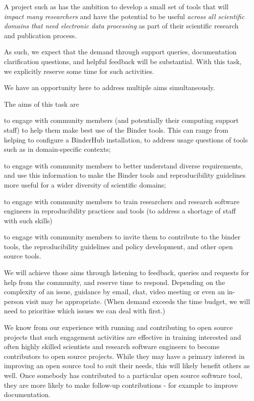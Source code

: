 \begin{task}[
  title=Community support and engagement,
  id=community-support,
  lead=SRL,
  PM=13,
  wphases={0-36!.36},
  partners={MP,QS,UIO,IFR}
]
A project such as \TheProject{} has the ambition to develop a small set of tools
that will \emph{impact many researchers} and have the potential to be useful
\emph{across all scientific domains that need electronic data processing} as part of their
scientific research and publication process.

As such, we expect that the demand through support queries, documentation
clarification questions, and helpful feedback will be substantial. With this
task, we explicitly reserve some time for such activities.

We have an opportunity here to address multiple aims simultaneously.

The aims of this task are
\begin{compactitem}
\item to engage with community members (and potentially their computing support
  staff) to help them make best use of the Binder tools. This can range from
  helping to configure a BinderHub installation, to address usage questions of
  tools such as \repotodocker{} in domain-specific contexts;
\item to engage with community members to better understand diverse
  requirements, and use this information to make the Binder tools and
  reproducibility guidelines more useful for a wider diversity of scientific
  domains;
\item to engage with community members to train researchers and research
  software engineers in reproducibility practices and tools (to address a
  shortage of staff with such skills)
\item to engage with community members to invite them to contribute to the
  binder tools, the reproducibility guidelines and policy development, and other
  open source tools.
\end{compactitem}

We will achieve those aims through listening to feedback, queries and requests
for help from the community, and reserve time to respond. Depending on the
complexity of an issue, guidance by email, chat, video meeting or even an
in-person visit may be appropriate. (When demand exceeds the time budget, we
will need to prioritise which issues we can deal with first.)

We know from our experience with running and contributing to open source
projects that such engagement activities are effective in training interested
and often highly skilled scientists and research software engineers to become
contributors to open source projects. While they may have a primary interest in
improving an open source tool to suit their needs, this will likely benefit
others as well. Once somebody has contributed to a particular open source
software tool, they are more likely to make follow-up contributions - for
example to improve documentation.

\end{task}
